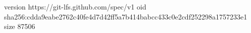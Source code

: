 version https://git-lfs.github.com/spec/v1
oid sha256:cdda9eabe2762c40fe4d7d42ff5a7b414babcc433c0e2cdf252298a1757233e1
size 87506

